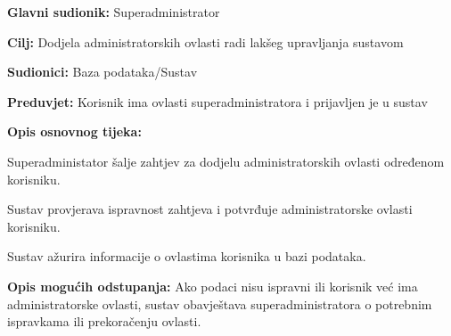 \noindent {}
\begin{packed_item}
	
	\item \textbf{Glavni sudionik: }Superadministrator
	\item  \textbf{Cilj:} Dodjela administratorskih ovlasti radi lakšeg upravljanja sustavom
	\item  \textbf{Sudionici:} Baza podataka/Sustav
	\item  \textbf{Preduvjet:} Korisnik ima ovlasti superadministratora i prijavljen je u sustav
	\item  \textbf{Opis osnovnog tijeka:}
	
	\item[] \begin{packed_enum}
		
		\item Superadministator šalje zahtjev za dodjelu administratorskih ovlasti određenom korisniku.
		\item Sustav provjerava ispravnost zahtjeva i potvrđuje administratorske ovlasti korisniku.
		\item Sustav ažurira informacije o ovlastima korisnika u bazi podataka.
		
	\end{packed_enum}
	
	\item  \textbf{Opis mogućih odstupanja:} Ako podaci nisu ispravni ili korisnik već ima administratorske ovlasti, sustav obavještava superadministratora o potrebnim ispravkama ili prekoračenju ovlasti.
	
	
\end{packed_item}

